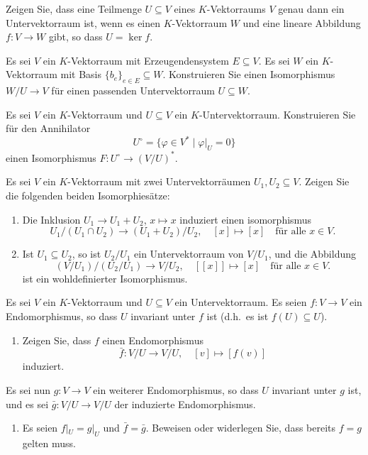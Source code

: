 \documentclass[a4paper,10pt]{scrartcl}
\begin{document}
\begin{question}
  Zeigen Sie, dass eine Teilmenge $U \subseteq V$ eines $K$-Vektorraums $V$ genau dann ein Untervektorraum ist, wenn es einen $K$-Vektorraum $W$ und eine lineare Abbildung $f \colon V \to W$ gibt, so dass $U = \ker f$.
\end{question}


\begin{question}
  Es sei $V$ ein $K$-Vektorraum mit Erzeugendensystem $E \subseteq V$.
  Es sei $W$ ein $K$-Vektorraum mit Basis $\{b_e\}_{e \in E} \subseteq W$.
  Konstruieren Sie einen Isomorphismus $W\!/U \to V$ für einen passenden Untervektorraum $U \subseteq W$.
\end{question}


\begin{question}
  Es sei $V$ ein $K$-Vektorraum und $U \subseteq V$ ein $K$-Untervektorraum.
  Konstruieren Sie für den Annihilator
  \[
      U^\circ
    = \{ \varphi \in V^* \mid \varphi|_U = 0 \}
  \]
  einen Isomorphismus $F \colon U^\circ \to (V\!/U)^*$.
\end{question}


\begin{question}
  Es sei $V$ ein $K$-Vektorraum mit zwei Untervektorräumen $U_1, U_2 \subseteq V$.
  Zeigen Sie die folgenden beiden Isomorphiesätze:
  \begin{enumerate}[leftmargin=*]
    \item
      Die Inklusion $U_1 \to U_1 + U_2$, $x \mapsto x$ induziert einen isomorphismus
      \[
        U_1 / (U_1 \cap U_2) \to (U_1 + U_2) / U_2,
        \quad
        [x] \mapsto [x]
        \quad
        \text{für alle $x \in V$}.
      \]
    \item
      Ist $U_1 \subseteq U_2$, so ist $U_2 / U_1$ ein Untervektorraum von $V / U_1$, und die Abbildung
      \[
        (V / U_1) / (U_2 / U_1) \to V / U_2,
        \quad
        [[x]] \mapsto [x]
        \quad
        \text{für alle $x \in V$}.
      \]
      ist ein wohldefinierter Isomorphismus.
  \end{enumerate}
\end{question}


\begin{question}
  Es sei $V$ ein $K$-Vektorraum und $U \subseteq V$ ein Untervektorraum.
  Es seien $f \colon V \to V$ ein Endomorphismus, so dass $U$ invariant unter $f$ ist (d.h.\ es ist $f(U) \subseteq U$).
  \begin{enumerate}
    \item
      Zeigen Sie, dass $f$ einen Endomorphismus
      \[
        \bar{f} \colon V\!/U \to V\!/U,
        \quad
        [v] \mapsto [f(v)]
      \]
    induziert.
  \end{enumerate}
  Es sei nun $g \colon V \to V$ ein weiterer Endomorphismus, so dass $U$ invariant unter $g$ ist, und es sei $\bar{g} \colon V\!/U \to V\!/U$ der induzierte Endomorphismus.
  \begin{enumerate}[resume]
    \item
      Es seien $f|_U = g|_U$ und $\bar{f} = \bar{g}$.
      Beweisen oder widerlegen Sie, dass bereits $f = g$ gelten muss.
  \end{enumerate}
\end{question}
\end{document}
